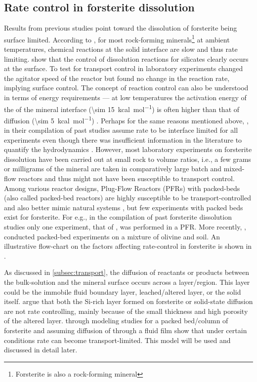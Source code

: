 \subsection{Rate control in forsterite dissolution}
Results from previous studies point toward the dissolution of forsterite being surface limited. According to \cite{schott2009}, for most rock-forming minerals\footnote{Forsterite is also a rock-forming mineral} at ambient temperatures, chemical reactions at the solid interface are slow and thus rate limiting. \cite{wogelius1991,brady1989} show that the control of dissolution reactions for silicates clearly occurs at the surface. To test for transport control in laboratory experiments \cite{luce1972} changed the agitator speed of the reactor but found no change in the reaction rate, implying surface control. The concept of reaction control can also be understood in terms of energy requirements --- at low temperatures the activation energy of the of the mineral interface (\SI{\sim 15}{kcal\per\mole}) is often higher than that of diffusion (\SI{\sim 5}{kcal\per\mole}) \citep{Brantley2008b}. Perhaps for the same reasons mentioned above, \cite{rimstidt2012}, in their compilation of past studies assume rate to be interface limited for all experiments even though there was insufficient information in the literature to quantify the hydrodynamics \citep{rimstidt2012}. However, most laboratory experiments on forsterite dissolution have been carried out at small rock to volume ratios, i.e., a few grams or milligrams of the mineral are taken in comparatively large batch and mixed-flow reactors \citep{awad2000,martinez2014} and thus might not have been susceptible to transport control. Among various reactor designs, Plug-Flow Reactors (PFRs) with packed-beds (also called packed-bed reactors) are highly susceptible to be transport-controlled and also better mimic natural systems \citep{Brantley2008a}, but few experiments with packed beds exist for forsterite. For e.g., in the compilation of past forsterite dissolution studies \citep{rimstidt2012} only one experiment, that of \cite{kleiv2006}, was performed in a PFR. More recently, \cite{renforth2015}, conducted packed-bed experiments on a mixture of olivine and soil. An illustrative flow-chart on the factors affecting rate-control in forsterite is shown in .

As discussed in \cref{subsec:transport}, the diffusion of reactants or products between the bulk-solution and the mineral surface occurs across a layer/region. This layer could be the immobile fluid boundary layer, leached/altered layer, or the solid itself. \cite{hellmann2012} argue that 
both the Si-rich layer formed on forsterite or solid-state diffusion are not rate controlling, mainly because of the small thickness and high porosity of the altered layer.  \cite{rimstidt2015} through modeling studies for a packed bed/column of forsterite and assuming diffusion of  through a fluid film show that under certain conditions rate can become transport-limited. This model will be used and discussed in detail later. 

